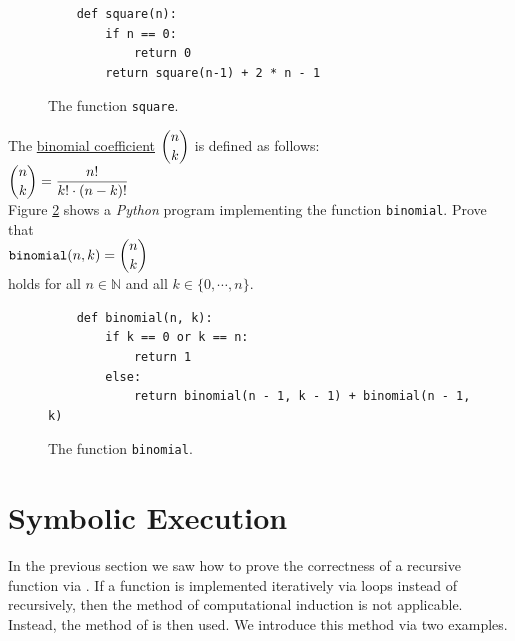 \begin{figure}[!ht]
\centering
\begin{verbatim}
    def square(n):
        if n == 0:
            return 0
        return square(n-1) + 2 * n - 1 
\end{verbatim}
\vspace*{-0.3cm}
\caption{The function \texttt{square}.}
\label{fig:square}
\end{figure}

\exerciseEng
The \href{https://en.wikipedia.org/wiki/Binomial_coefficient}{binomial coefficient} $\displaystyle {n \choose k}$ is defined as follows:
\\[0.2cm]
\hspace*{1.3cm}
$\displaystyle {n \choose k} = \frac{n!}{k! \cdot (n-k)!}$
\\[0.2cm]
Figure \ref{fig:binomial} shows a \textsl{Python} program implementing the function \texttt{binomial}.  Prove
that 
\\[0.2cm]
\hspace*{1.3cm}
$\displaystyle \mathtt{binomial}(n, k) = {n \choose k}$
\\[0.2cm]
holds for all $n \in \mathbb{N}$ and all $k \in \{ 0, \cdots, n \}$. \eox

\begin{figure}[!ht]
\centering
\begin{verbatim}
    def binomial(n, k):
        if k == 0 or k == n:
            return 1
        else:
            return binomial(n - 1, k - 1) + binomial(n - 1, k)                
\end{verbatim}
\vspace*{-0.3cm}
\caption{The function \texttt{binomial}.}
\label{fig:binomial}
\end{figure}



\section{Symbolic Execution}
In the previous section we saw how to prove the correctness of a recursive function via
.  If a function is implemented iteratively via loops instead of recursively,
then the method of computational induction is not applicable.   Instead, the method of 
  is then used.
We introduce this method via two examples.

